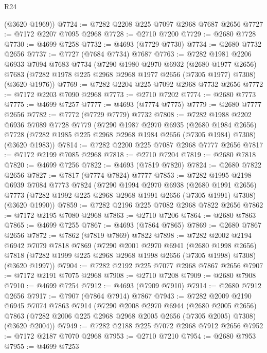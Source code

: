 \begin{lexlean}{R24}
\begin{coremodule}
      (@3620 @1969))
@7724 := @7282 @2208 @225 @7097 @2968 @7687 @2656
@7727 := @7172 @2207 @7095 @2968
@7728 := @2710 @7200
@7729 := @2680 @7728
@7730 := @4699 @7258
@7732 := @4693 (@7729 @7730)
@7734 := @2680 @7732 @2656
@7737 := @7727 (@7684 @7734) @7687
@7763 := @7282
    @1981
    @2206
    @6933
    @7094
    @7683
    @7734
    (@7290
      @1980
      @2970
      @6932
      (@2680 @1977 @2656)
      @7683
      (@7282 @1978 @225 @2968 @2968 @1977 @2656 (@7305 @1977) @7308)
      (@3620 @1976))
@7769 := @7282 @2204 @225 @7092 @2968 @7732 @2656
@7772 := @7172 @2203 @7090 @2968
@7773 := @2710 @7202
@7774 := @2680 @7773
@7775 := @4699 @7257
@7777 := @4693 (@7774 @7775)
@7779 := @2680 @7777 @2656
@7782 := @7772 (@7729 @7779) @7732
@7808 := @7282
    @1988
    @2202
    @6936
    @7089
    @7728
    @7779
    (@7290
      @1987
      @2970
      @6935
      (@2680 @1984 @2656)
      @7728
      (@7282 @1985 @225 @2968 @2968 @1984 @2656 (@7305 @1984) @7308)
      (@3620 @1983))
@7814 := @7282 @2200 @225 @7087 @2968 @7777 @2656
@7817 := @7172 @2199 @7085 @2968
@7818 := @2710 @7204
@7819 := @2680 @7818
@7820 := @4699 @7256
@7822 := @4693 (@7819 @7820)
@7824 := @2680 @7822 @2656
@7827 := @7817 (@7774 @7824) @7777
@7853 := @7282
    @1995
    @2198
    @6939
    @7084
    @7773
    @7824
    (@7290
      @1994
      @2970
      @6938
      (@2680 @1991 @2656)
      @7773
      (@7282 @1992 @225 @2968 @2968 @1991 @2656 (@7305 @1991) @7308)
      (@3620 @1990))
@7859 := @7282 @2196 @225 @7082 @2968 @7822 @2656
@7862 := @7172 @2195 @7080 @2968
@7863 := @2710 @7206
@7864 := @2680 @7863
@7865 := @4699 @7255
@7867 := @4693 (@7864 @7865)
@7869 := @2680 @7867 @2656
@7872 := @7862 (@7819 @7869) @7822
@7898 := @7282
    @2002
    @2194
    @6942
    @7079
    @7818
    @7869
    (@7290
      @2001
      @2970
      @6941
      (@2680 @1998 @2656)
      @7818
      (@7282 @1999 @225 @2968 @2968 @1998 @2656 (@7305 @1998) @7308)
      (@3620 @1997))
@7904 := @7282 @2192 @225 @7077 @2968 @7867 @2656
@7907 := @7172 @2191 @7075 @2968
@7908 := @2710 @7208
@7909 := @2680 @7908
@7910 := @4699 @7254
@7912 := @4693 (@7909 @7910)
@7914 := @2680 @7912 @2656
@7917 := @7907 (@7864 @7914) @7867
@7943 := @7282
    @2009
    @2190
    @6945
    @7074
    @7863
    @7914
    (@7290
      @2008
      @2970
      @6944
      (@2680 @2005 @2656)
      @7863
      (@7282 @2006 @225 @2968 @2968 @2005 @2656 (@7305 @2005) @7308)
      (@3620 @2004))
@7949 := @7282 @2188 @225 @7072 @2968 @7912 @2656
@7952 := @7172 @2187 @7070 @2968
@7953 := @2710 @7210
@7954 := @2680 @7953
@7955 := @4699 @7253

\end{coremodule}
\end{lexlean}

